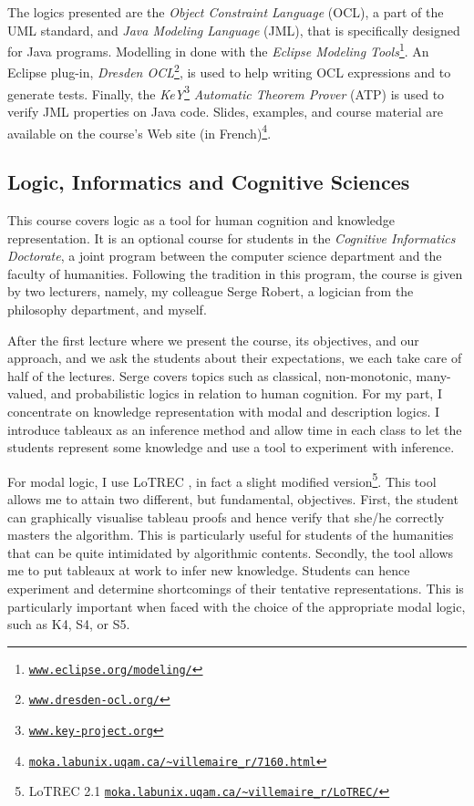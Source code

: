 \documentclass[a4paper,UKenglish]{lipics}
\begin{document}
The logics presented are the \emph{Object Constraint Language} (OCL), a part of the UML standard, and \emph{Java Modeling Language} (JML), that is specifically designed for Java programs. Modelling in done with the \emph{Eclipse Modeling Tools}\footnote{\href{http://www.eclipse.org/modeling/}{\nolinkurl{www.eclipse.org/modeling/}}}. An Eclipse plug-in, \emph{Dresden OCL}\footnote{\href{http://www.dresden-ocl.org/}{\nolinkurl{www.dresden-ocl.org/}}}, is used to help writing OCL expressions and to generate tests. Finally, the \emph{KeY}\footnote{\href{http://www.key-project.org}{\nolinkurl{www.key-project.org}}} \emph{Automatic Theorem Prover} (ATP) is used to verify JML properties on Java code. Slides, examples, and course material are available on the course's Web site (in French)\footnote{\href{http://moka.labunix.uqam.ca/~villemaire_r/7160.html}{\nolinkurl{moka.labunix.uqam.ca/~villemaire_r/7160.html}}}.

\subsection{Logic, Informatics and Cognitive Sciences}\label{SUBSECLICS}
This course covers logic as a tool for human cognition and knowledge representation. It is an optional course for students in the \emph{Cognitive Informatics Doctorate}, a joint program between the computer science department and the faculty of humanities. Following the tradition in this program, the course is given by two lecturers, namely, my colleague Serge Robert, a logician from the philosophy department, and myself.

After the first lecture where we present the course, its objectives, and our approach, and we ask the students about their expectations, we each take care of half of the lectures. Serge covers topics such as classical, non-monotonic, many-valued, and probabilistic logics in relation to human cognition. For my part, I concentrate on knowledge representation with modal and description logics. I introduce tableaux as an inference method and allow time in each class to let the students represent some knowledge and use a tool to experiment with inference.

For modal logic, I use LoTREC \cite{lfdcogahmsICTTL06}, in fact a slight modified version\footnote{LoTREC 2.1 \href{http://moka.labunix.uqam.ca/~villemaire_r/LoTREC/}{\nolinkurl{moka.labunix.uqam.ca/~villemaire_r/LoTREC/}}}. This tool allows me to attain two different, but fundamental, objectives. First, the student can graphically visualise tableau proofs and hence verify that she/he correctly masters the algorithm. This is particularly useful for students of the humanities that can be quite intimidated by algorithmic contents. Secondly, the tool allows me to put tableaux at work to infer new knowledge. Students can hence experiment and determine shortcomings of their tentative representations. This is particularly important when faced with the choice of the appropriate modal logic, such as K4, S4, or S5.
\end{document}
